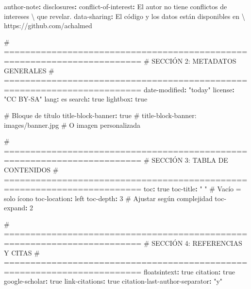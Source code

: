 \documentclass[
  doc,
  floatsintext,
  longtable,
  a4paper,
  nolmodern,
  notxfonts,
  notimes,
  12pt,
  colorlinks=true,linkcolor=blue,citecolor=blue,urlcolor=blue]{apa7}
\newenvironment{Shaded}{\begin{snugshade}}{\end{snugshade}}
\newcommand{\AttributeTok}[1]{\textcolor[rgb]{0.40,0.45,0.13}{#1}}
\newcommand{\CharTok}[1]{\textcolor[rgb]{0.13,0.47,0.30}{#1}}
\newcommand{\CommentTok}[1]{\textcolor[rgb]{0.37,0.37,0.37}{#1}}
\newcommand{\DecValTok}[1]{\textcolor[rgb]{0.68,0.00,0.00}{#1}}
\newcommand{\FunctionTok}[1]{\textcolor[rgb]{0.28,0.35,0.67}{#1}}
\newcommand{\KeywordTok}[1]{\textcolor[rgb]{0.00,0.23,0.31}{\textbf{#1}}}
\newcommand{\StringTok}[1]{\textcolor[rgb]{0.13,0.47,0.30}{#1}}
\begin{document}
\begin{Shaded}
\begin{Highlighting}[]
\FunctionTok{author{-}note}\KeywordTok{:}
\AttributeTok{  }\FunctionTok{disclosures}\KeywordTok{:}
\AttributeTok{    }\FunctionTok{conflict{-}of{-}interest}\KeywordTok{:}\AttributeTok{ El autor no tiene conflictos de intereses  \textbackslash{}}
\AttributeTok{    que revelar.}
\AttributeTok{    }\FunctionTok{data{-}sharing}\KeywordTok{:}\AttributeTok{ El código y los datos están disponibles en  \textbackslash{}}
\AttributeTok{    https://github.com/achalmed}

\CommentTok{\# ========================================================================}
\CommentTok{\# SECCIÓN 2: METADATOS GENERALES}
\CommentTok{\# ========================================================================}
\FunctionTok{date{-}modified}\KeywordTok{:}\AttributeTok{ }\StringTok{"today"}
\FunctionTok{license}\KeywordTok{:}\AttributeTok{ }\StringTok{"CC BY{-}SA"}
\FunctionTok{lang}\KeywordTok{:}\AttributeTok{ es}
\FunctionTok{search}\KeywordTok{:}\AttributeTok{ }\CharTok{true}
\FunctionTok{lightbox}\KeywordTok{:}\AttributeTok{ }\CharTok{true}

\CommentTok{\# Bloque de título}
\FunctionTok{title{-}block{-}banner}\KeywordTok{:}\AttributeTok{ }\CharTok{true}
\CommentTok{\# title{-}block{-}banner: images/banner.jpg  \# O imagen personalizada}

\CommentTok{\# ========================================================================}
\CommentTok{\# SECCIÓN 3: TABLA DE CONTENIDOS}
\CommentTok{\# ========================================================================}
\FunctionTok{toc}\KeywordTok{:}\AttributeTok{ }\CharTok{true}
\FunctionTok{toc{-}title}\KeywordTok{:}\AttributeTok{ }\StringTok{" "}\CommentTok{                            \# Vacío = solo ícono}
\FunctionTok{toc{-}location}\KeywordTok{:}\AttributeTok{ left}
\FunctionTok{toc{-}depth}\KeywordTok{:}\AttributeTok{ }\DecValTok{3}\CommentTok{                              \# Ajustar según complejidad}
\FunctionTok{toc{-}expand}\KeywordTok{:}\AttributeTok{ }\DecValTok{2}

\CommentTok{\# ========================================================================}
\CommentTok{\# SECCIÓN 4: REFERENCIAS Y CITAS}
\CommentTok{\# ========================================================================}
\FunctionTok{floatsintext}\KeywordTok{:}\AttributeTok{ }\CharTok{true}
\FunctionTok{citation}\KeywordTok{:}\AttributeTok{ }\CharTok{true}
\FunctionTok{google{-}scholar}\KeywordTok{:}\AttributeTok{ }\CharTok{true}
\FunctionTok{link{-}citations}\KeywordTok{:}\AttributeTok{ }\CharTok{true}
\FunctionTok{citation{-}last{-}author{-}separator}\KeywordTok{:}\AttributeTok{ }\StringTok{"y"}


\end{Highlighting}
\end{Shaded}
\end{document}
